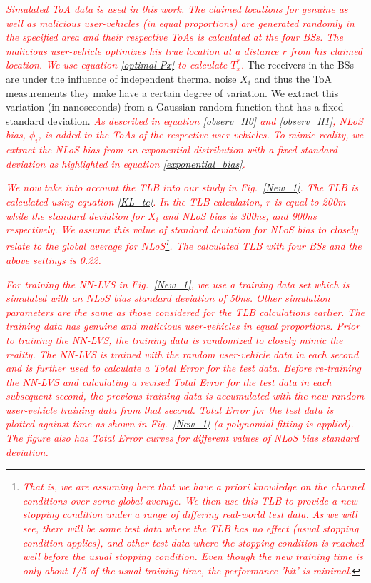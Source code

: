 \documentclass[journal]{IEEEtran}
\begin{document}
\textcolor{red}{\textit{Simulated ToA data is used in this work. The \emph{claimed} locations for genuine as well as malicious user-vehicles (in equal proportions) are generated randomly in the specified area and their respective ToAs is calculated at the four BSs. The malicious user-vehicle optimizes his true location at a distance $r$ from his claimed location. We use equation \eqref{optimal Px} to calculate $T_x^*$.}} The receivers in the BSs are under the influence of independent thermal noise $X_i$ and thus the ToA measurements they make have a certain degree of variation. We extract this variation (in nanoseconds) from a Gaussian random function that has a fixed standard deviation. \textcolor{red}{\textit{As described in equation \eqref{observ_H0} and \eqref{observ_H1}, NLoS bias, $\phi_i$, is added to the ToAs of the respective user-vehicles. To mimic reality, we extract the NLoS bias from an exponential distribution with a fixed standard deviation as highlighted in equation \eqref{exponential_bias}.}}

\textcolor{red}{\textit{We now take into account the TLB into our study in Fig.~\ref{New_1}. The TLB is calculated using equation \eqref{KL_te}. In the TLB calculation, $r$ is equal to 200m while the standard deviation for $X_i$ and NLoS bias is 300ns, and 900ns respectively. We assume this value of standard deviation for NLoS bias to closely relate to the global average for NLoS\footnote{\textcolor{red}{\textit{That is, we are assuming here that we have  \emph{a priori} knowledge on the channel conditions over some global average. We then use this TLB to provide a new stopping condition under a range of differing real-world test data. As we will see, there will be some test data where the TLB has no effect (usual stopping condition applies), and other test data where the stopping condition is reached well before the usual stopping condition. Even though the new training time is only about 1/5 of the usual training time, the  performance 'hit' is minimal.}}}. The calculated TLB with four BSs and the above settings is 0.22.}}

\textcolor{red}{\textit{For training the NN-LVS in Fig.~\ref{New_1}, we use a training data set which is simulated with an NLoS bias standard deviation of 50ns. Other simulation parameters are the same as those considered for the TLB calculations earlier. The training data has genuine and malicious user-vehicles in equal proportions. Prior to training the NN-LVS, the training data is randomized to closely mimic the reality. The NN-LVS is trained with the random user-vehicle data in each second and is further used to calculate a Total Error for the test data. Before re-training the NN-LVS and calculating a revised Total Error for the test data in each subsequent second, the previous training data is accumulated with the new random user-vehicle training data from that second. Total Error for the test data is plotted against time as shown in Fig.~\ref{New_1} (a polynomial fitting is applied). The figure also has Total Error curves for different values of NLoS bias standard deviation.}}
\end{document}
